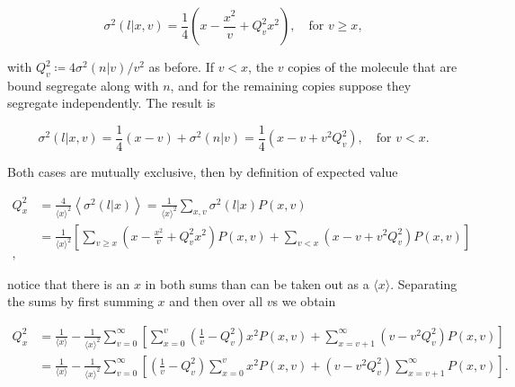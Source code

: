 \begin{equation*}
  \sigma^2(l|x,v) =\frac{1}{4}\left(x-\frac{x^2}{v}+Q_v^2x^2\right),\quad \text{for } v\geq x,
\end{equation*}

with $Q_v^2 \coloneqq 4\sigma^2(n|v)/v^2$ as before. If $v<x$, the $v$ copies of the molecule that are bound segregate along with $n$, and for the remaining copies suppose they segregate independently. The result is

\begin{equation*}
  \sigma^2(l|x,v) = \frac{1}{4}(x-v) + \sigma^2(n|v) = \frac{1}{4}\left(x-v+v^2Q_v^2\right),\quad \text{for } v<x.
\end{equation*}

Both cases are mutually exclusive, then by definition of expected value

\begin{equation*}
  \begin{split}
    Q_x^2 &= \frac{4}{\langle x\rangle^2}\left\langle\sigma^2(l|x)\right\rangle = \frac{1}{\langle x\rangle^2}\sum_{x,v}\sigma^2(l|x)P(x,v)\\
    &=\frac{1}{\langle x\rangle^2}\left[\sum_{v\geq x}\left(x-\frac{x^2}{v}+Q_v^2x^2\right)P(x,v) + \sum_{v<x}\left(x-v+v^2Q_v^2\right)P(x,v)\right]\\,
  \end{split}
\end{equation*}

notice that there is an $x$ in both sums than can be taken out as a $\langle x\rangle$. Separating the sums by first summing $x$ and then over all $v$s we obtain

\begin{equation*}
  \begin{split}
     Q_x^2 &= \frac{1}{\langle x\rangle} - \frac{1}{\langle x\rangle^2}\sum_{v=0}^\infty\left[\sum_{x=0}^v\left(\frac{1}{v}-Q_v^2\right)x^2P(x,v)+\sum_{x=v+1}^\infty\left(v-v^2Q_v^2\right)P(x,v)\right]\\
     &=\frac{1}{\langle x\rangle} - \frac{1}{\langle x\rangle^2}\sum_{v=0}^\infty\left[\left(\frac{1}{v}-Q_v^2\right)\sum_{x=0}^vx^2P(x,v)+\left(v-v^2Q_v^2\right)\sum_{x=v+1}^\infty P(x,v)\right].
  \end{split}
\end{equation*}


